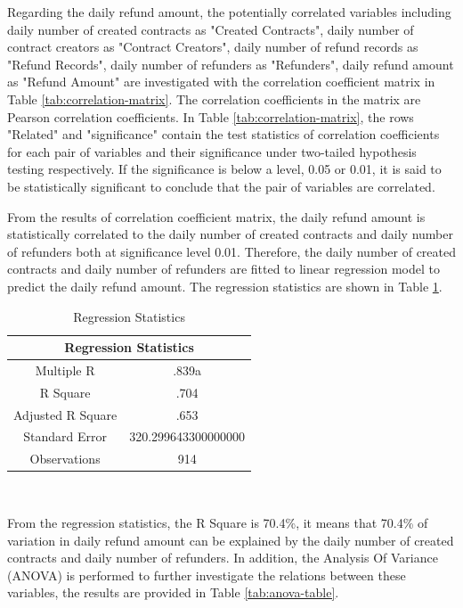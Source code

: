 Regarding the daily refund amount, the potentially correlated variables including daily number of created contracts as "Created Contracts", daily number of contract creators as "Contract Creators", daily number of refund records as "Refund Records", daily number of refunders as "Refunders", daily refund amount as "Refund Amount" are investigated with the correlation coefficient matrix in Table \ref{tab:correlation-matrix}. The correlation coefficients in the matrix are Pearson correlation coefficients. In Table \ref{tab:correlation-matrix}, the rows "Related" and "significance" contain the test statistics of correlation coefficients for each pair of variables and their significance under two-tailed hypothesis testing respectively. If the significance is below a level, 0.05 or 0.01, it is said to be statistically significant to conclude that the pair of variables are correlated.

From the results of correlation coefficient matrix, the daily refund amount is statistically correlated to the daily number of created contracts and daily number of refunders both at significance level 0.01. Therefore, the daily number of created contracts and daily number of refunders are fitted to linear regression model to predict the daily refund amount. The regression statistics are shown in Table \ref{tab:regression-statistics}.

\begin{table}[h]
\caption{Regression Statistics}
\label{tab:regression-statistics}
\begin{tabular}{c|c}
\hline
\multicolumn{2}{c}{Regression Statistics} \\
\hline
Multiple R & .839a \\
\hline
R Square & .704 \\
\hline
Adjusted R Square & .653 \\
\hline
Standard Error & 320.299643300000000 \\
\hline
Observations & 914 \\
\hline
\end{tabular}\\
\end{table}

From the regression statistics, the R Square is 70.4\%, it means that 70.4\% of variation in daily refund amount can be explained by the daily number of created contracts and daily number of refunders. In addition, the Analysis Of Variance (ANOVA) is performed to further investigate the relations between these variables, the results are provided in Table \ref{tab:anova-table}.


